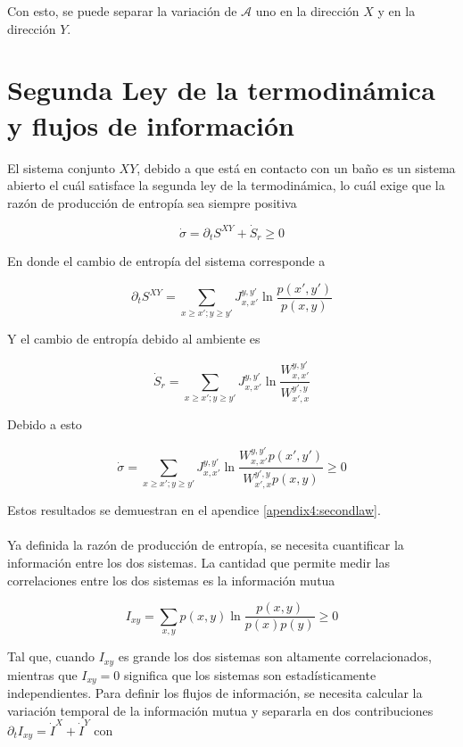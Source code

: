 Con esto, se puede separar la variación de $\mathcal{A}$ uno en la dirección $X$ y en la dirección $Y$. 

\label{sec4:flujos}
\section{Segunda Ley de la termodinámica y flujos de información}
El sistema conjunto $XY$, debido a que está en contacto con un baño es un sistema abierto el cuál satisface la segunda ley de la termodinámica, lo cuál exige que la razón de producción de entropía sea siempre positiva

\begin{equation*}
    \dot{\sigma} = \partial_{t}S^{XY} + \dot{S}_{r} \geq 0 
\end{equation*}

En donde el cambio de entropía del sistema corresponde a 

\begin{equation*}
    \partial_{t}S^{XY} = \sum_{x\geq x'; y\geq y'} J_{x,x'}^{y,y'} \ln \frac{p(x',y')}{p(x,y)}
\end{equation*}

Y el cambio de entropía debido al ambiente es

\begin{equation*}
    \dot{S}_{r} = \sum_{x\geq x'; y\geq y'} J_{x,x'}^{y,y'} \ln \frac{W_{x,x'}^{y,y'}}{W_{x',x}^{y',y}}
\end{equation*}

Debido a esto

\begin{equation*}
    \dot{\sigma} = \sum_{x\geq x'; y\geq y'} J_{x,x'}^{y,y'} \ln \frac{ W_{x,x'}^{y,y'}p(x',y')  }{ W_{x',x}^{y',y}p(x,y) } \geq 0
\end{equation*}

Estos resultados se demuestran en el apendice \ref{apendix4:secondlaw}. \\ 
\\
Ya definida la razón de producción de entropía, se necesita cuantificar la información entre los dos sistemas. La cantidad que permite medir las correlaciones entre los dos sistemas es la información mutua

\begin{equation*}
    I_{xy} = \sum_{x,y} p(x,y) \ln \frac{p(x,y)}{p(x)p(y)} \geq 0 
\end{equation*}

Tal que, cuando $I_{xy}$ es grande los dos sistemas son altamente correlacionados, mientras que $I_{xy}=0$ significa que los sistemas son estadísticamente independientes. Para definir los flujos de información, se necesita calcular la variación temporal de la información mutua y separarla en dos contribuciones $\partial_{t} I_{xy} = \dot{I}^{X} + \dot{I}^{Y}$ con


